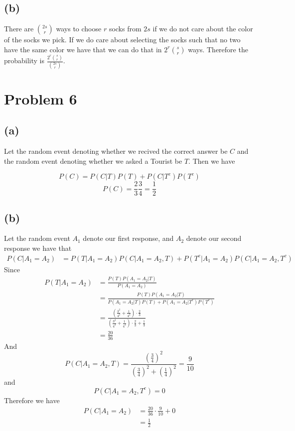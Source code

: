 \subsection*{(b)}
There are $2s \choose r$ ways to choose $r$ socks from $2s$ if we do not care about the color of the socks we pick. If we do care about
selecting the socks such that no two have the same color we have that we can do that
in $2^r{s\choose r}$ ways. 
Therefore the probability is $\boxed{\frac{2^r{s\choose r}}{{2s \choose r}}}$.
\section*{Problem 6}
\subsection*{(a)}
Let the random event denoting whether we recived the correct answer 
be $C$ and the random event denoting whether we asked a Tourist be 
$T$. Then we have

$$P(C)=P(C|T)P(T)+P(C|T^c)P(T^c)$$
$$P(C)=\frac{2}{3}\frac{3}{4}=\boxed{\frac{1}{2}}$$
\subsection*{(b)}
Let the random event $A_1$ denote our first response, and $A_2$ denote our
second response we have that
\begin{align*}
    P(C|A_1=A_2)&=P(T|A_1=A_2)P(C|A_1=A_2,T)+P(T^c|A_1=A_2)P(C|A_1=A_2,T^c)
\end{align*}
Since 
\begin{align*}
    P(T|A_1=A_2)&=\frac{P(T)P(A_1=A_2|T)}{P(A_1=A_2)}\\
    &=\frac{P(T)P(A_1=A_2|T)}{P(A_1=A_2|T)P(T)+P(A_1=A_2|T^c)P(T^c)}\\
    &=\frac{\left(\frac{3^2}{4^2}+\frac{1}{4^2}\right)\cdot\frac{2}{3}}{\left(\frac{3^2}{4^2}+\frac{1}{4^2}\right)\cdot\frac{2}{3}+\frac{1}{3}}\\
    &=\frac{20}{36}
\end{align*}
And 
$$P(C|A_1=A_2,T)=\frac{\left(\frac{3}{4}\right)^2}{\left(\frac{3}{4}\right)^2+\left(\frac{1}{4}\right)^2}=\frac{9}{10}$$
and 
$$P(C|A_1=A_2,T^c)=0$$
Therefore we have
\begin{align*}
    P(C|A_1=A_2)&=\frac{20}{36}\cdot\frac{9}{10}+0\\
    &=\boxed{\frac{1}{2}}
\end{align*}

